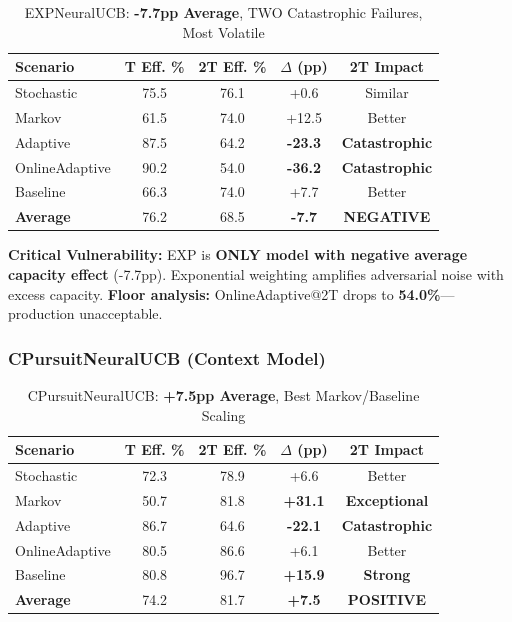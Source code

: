 \documentclass[11pt,a4paper]{article}
\newcommand{\critical}[1]{\textcolor{criticalcolor}{\textbf{#1}}}
\newcommand{\success}[1]{\textcolor{successcolor}{\textbf{#1}}}
\begin{document}
\vspace{-0.4cm}

\begin{table}[H]
\scriptsize
\centering
\begin{tabular}{lcccc}
\toprule
\textbf{Scenario} & \textbf{T Eff. \%} & \textbf{2T Eff. \%} & \textbf{$\Delta$ (pp)} & \textbf{2T Impact} \\
\midrule
Stochastic & 75.5 & 76.1 & +0.6 & Similar \\
Markov & 61.5 & 74.0 & +12.5 & Better \\
Adaptive & 87.5 & 64.2 & \critical{-23.3} & \critical{Catastrophic} \\
OnlineAdaptive & 90.2 & 54.0 & \critical{-36.2} & \critical{Catastrophic} \\
Baseline & 66.3 & 74.0 & +7.7 & Better \\
\midrule
\textbf{Average} & 76.2 & 68.5 & \critical{-7.7} & \critical{NEGATIVE} \\
\bottomrule
\end{tabular}
\vspace{-0.2cm}
\caption{EXPNeuralUCB: \critical{-7.7pp Average}, TWO Catastrophic Failures, Most Volatile}
\end{table}

\vspace{-0.2cm}

\textbf{Critical Vulnerability:} EXP is \critical{ONLY model with negative average capacity effect} (-7.7pp). Exponential weighting amplifies adversarial noise with excess capacity. \textbf{Floor analysis:} OnlineAdaptive@2T drops to \critical{54.0\%}—production unacceptable.

\subsubsection{CPursuitNeuralUCB (Context Model)}

\vspace{-0.4cm}

\begin{table}[H]
\scriptsize
\centering
\begin{tabular}{lcccc}
\toprule
\textbf{Scenario} & \textbf{T Eff. \%} & \textbf{2T Eff. \%} & \textbf{$\Delta$ (pp)} & \textbf{2T Impact} \\
\midrule
Stochastic & 72.3 & 78.9 & +6.6 & Better \\
Markov & 50.7 & 81.8 & \success{+31.1} & \success{Exceptional} \\
Adaptive & 86.7 & 64.6 & \critical{-22.1} & \critical{Catastrophic} \\
OnlineAdaptive & 80.5 & 86.6 & +6.1 & Better \\
Baseline & 80.8 & 96.7 & \success{+15.9} & \success{Strong} \\
\midrule
\textbf{Average} & 74.2 & 81.7 & \success{+7.5} & \success{POSITIVE} \\
\bottomrule
\end{tabular}
\vspace{-0.2cm}
\caption{CPursuitNeuralUCB: \success{+7.5pp Average}, Best Markov/Baseline Scaling}
\end{table}
\end{document}
